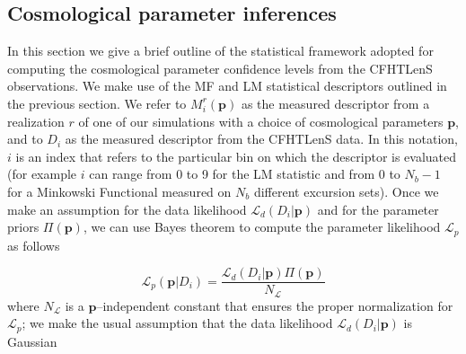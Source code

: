 \documentclass[reprint,aps,prd,superscriptaddress,showkeys,showpacs]{revtex4-1}
\begin{document}

\subsection{Cosmological parameter inferences}
\label{cosmostats}

In this section we give a brief outline of the statistical framework adopted for computing the cosmological parameter confidence levels from the CFHTLenS observations. We make use of the MF and LM statistical descriptors outlined in the previous section. We refer to $M_i^r(\mathbf{p})$ as the measured descriptor from a realization $r$ of one of our simulations with a choice of cosmological parameters $\mathbf{p}$, and to $D_i$ as the measured descriptor from the CFHTLenS data. In this notation, $i$ is an index that refers to the particular bin on which the descriptor is evaluated (for example $i$ can range from 0 to 9 for the LM statistic and from 0 to $N_b-1$ for a Minkowski Functional measured on $N_b$ different excursion sets). Once we make an assumption for the data likelihood $\mathcal{L}_d(D_i\vert \mathbf{p})$ and for the parameter priors $\Pi(\mathbf{p})$, we can use Bayes theorem to compute the parameter likelihood $\mathcal{L}_p$ as follows

\begin{equation}
\label{parameterlikelihood}
\mathcal{L}_p(\mathbf{p}\vert D_i) = \frac{\mathcal{L}_d(D_i\vert \mathbf{p})\Pi(\mathbf{p})}{N_{\mathcal{L}}}
\end{equation}
%
where $N_{\mathcal{L}}$ is a $\mathbf{p}$--independent constant that ensures the proper normalization for $\mathcal{L}_p$; we make the usual assumption that the data likelihood $\mathcal{L}_d(D_i\vert \mathbf{p})$ is Gaussian

\end{document}
